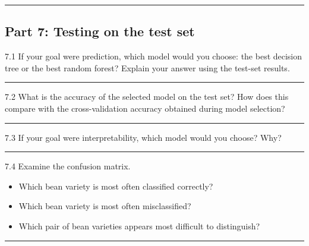 \documentclass[
  a4paper,
  DIV=11,
  numbers=noendperiod]{scrartcl}
\providecommand{\tightlist}{%
  \setlength{\itemsep}{0pt}\setlength{\parskip}{0pt}}
\begin{document}
\begin{center}\rule{0.5\linewidth}{0.5pt}\end{center}

\subsection{Part 7: Testing on the test
set}\label{part-7-testing-on-the-test-set}

7.1 If your goal were prediction, which model would you choose: the best
decision tree or the best random forest? Explain your answer using the
test-set results.

\begin{center}\rule{0.5\linewidth}{0.5pt}\end{center}

7.2 What is the accuracy of the selected model on the test set? How does
this compare with the cross-validation accuracy obtained during model
selection?

\begin{center}\rule{0.5\linewidth}{0.5pt}\end{center}

7.3 If your goal were interpretability, which model would you choose?
Why?

\begin{center}\rule{0.5\linewidth}{0.5pt}\end{center}

7.4 Examine the confusion matrix.

\begin{itemize}
\tightlist
\item
  Which bean variety is most often classified correctly?
\item
  Which bean variety is most often misclassified?
\item
  Which pair of bean varieties appears most difficult to distinguish?
\end{itemize}

\begin{center}\rule{0.5\linewidth}{0.5pt}\end{center}
\end{document}
